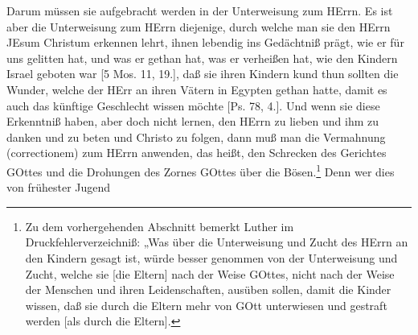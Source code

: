 Darum müssen sie aufgebracht werden in der Unterweisung zum HErrn. Es ist aber die Unterweisung zum HErrn diejenige, durch welche man sie den HErrn JEsum Christum erkennen lehrt, ihnen lebendig ins Gedächtniß prägt, wie er für uns gelitten hat, und was er gethan hat, was er verheißen hat, wie den Kindern Israel geboten war [5 Mos. 11, 19.], daß sie ihren Kindern kund thun sollten die Wunder, welche der HErr an ihren Vätern in Egypten gethan hatte, damit es auch das künftige Geschlecht wissen möchte [Ps. 78, 4.]. Und wenn sie diese Erkenntniß haben, aber doch nicht lernen, den HErrn zu lieben und ihm zu danken und zu beten und Christo zu folgen, dann muß man die Vermahnung (correctionem) zum HErrn anwenden, das heißt, den Schrecken des Gerichtes GOttes und die Drohungen des Zornes GOttes über die Bösen.\footnote{Zu dem vorhergehenden Abschnitt bemerkt Luther im Druckfehlerverzeichniß: „Was über die Unterweisung und Zucht des HErrn an den Kindern gesagt ist, würde besser genommen von der Unterweisung und Zucht, welche sie [die Eltern] nach der Weise GOttes, nicht nach der Weise der Menschen und ihren Leidenschaften, ausüben sollen, damit die Kinder wissen, daß sie durch die Eltern mehr von GOtt unterwiesen und gestraft werden [als durch die Eltern].} Denn wer dies von frühester Jugend
